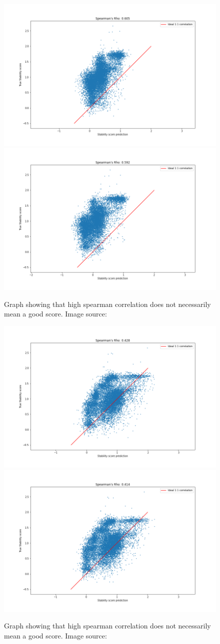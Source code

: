 \begin{figure}[!ht]
  \centering
  \includegraphics[width=0.4\linewidth]{latex/imgs/spearman_1_layer_no_schedule_512_final.png}
  \includegraphics[width=0.4\linewidth]{latex/imgs/spearman_1_layer_no_schedule_512_minloss.png}
  \caption{Graph showing that high spearman correlation does not necessarily mean a good score. Image source:\cite{spearman}}
\end{figure}
\begin{figure}[!ht]
  \centering
  \includegraphics[width=0.4\linewidth]{latex/imgs/spearman_1_layer_with_schedule_512_final.png}
  \includegraphics[width=0.4\linewidth]{latex/imgs/spearman_1_layer_with_schedule_512_minloss.png}
  \caption{Graph showing that high spearman correlation does not necessarily mean a good score. Image source:\cite{spearman}}
\end{figure}
